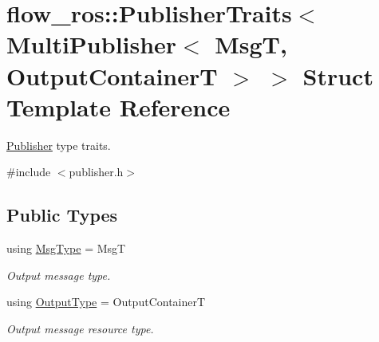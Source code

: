 \hypertarget{structflow__ros_1_1_publisher_traits_3_01_multi_publisher_3_01_msg_t_00_01_output_container_t_01_4_01_4}{}\section{flow\+\_\+ros\+:\+:Publisher\+Traits$<$ Multi\+Publisher$<$ MsgT, Output\+ContainerT $>$ $>$ Struct Template Reference}
\label{structflow__ros_1_1_publisher_traits_3_01_multi_publisher_3_01_msg_t_00_01_output_container_t_01_4_01_4}


\hyperlink{classflow__ros_1_1_publisher}{Publisher} type traits.  




{\ttfamily \#include $<$publisher.\+h$>$}

\subsection*{Public Types}
\begin{DoxyCompactItemize}
\item 
\mbox{\label{structflow__ros_1_1_publisher_traits_3_01_multi_publisher_3_01_msg_t_00_01_output_container_t_01_4_01_4_aede28ba7c9d7a33ecb3dd03a0f08a480}} 
using \hyperlink{structflow__ros_1_1_publisher_traits_3_01_multi_publisher_3_01_msg_t_00_01_output_container_t_01_4_01_4_aede28ba7c9d7a33ecb3dd03a0f08a480}{Msg\+Type} = MsgT
\begin{DoxyCompactList}\small\item\em Output message type. \end{DoxyCompactList}\item 
\mbox{\label{structflow__ros_1_1_publisher_traits_3_01_multi_publisher_3_01_msg_t_00_01_output_container_t_01_4_01_4_a34fe06451ca504ddd1673dd8c54f065f}} 
using \hyperlink{structflow__ros_1_1_publisher_traits_3_01_multi_publisher_3_01_msg_t_00_01_output_container_t_01_4_01_4_a34fe06451ca504ddd1673dd8c54f065f}{Output\+Type} = Output\+ContainerT
\begin{DoxyCompactList}\small\item\em Output message resource type. \end{DoxyCompactList}\end{DoxyCompactItemize}


